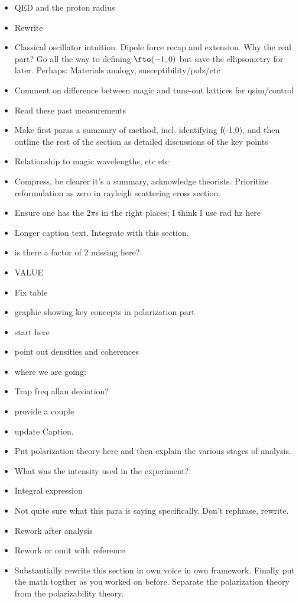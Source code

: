 \begin{itemize}
\item {QED and the proton radius}
\item {Rewrite}
\item {Classical oscillator intuition. Dipole force recap and extension. Why the real part? Go all the way to defining $\fto(-1,0)$ but save the ellipsometry for later. Perhaps: Materials analogy, susceptibility/polz/etc}
\item {Comment on difference between magic and tune-out lattices for qsim/control}
\item {Read these past measurements}
\item {Make first paras a summary of method, incl. identifying f(-1,0), and then outline the rest of the section as detailed discussions of the key points}
\item {Relationship to magic wavelengths, etc etc}
\item {Compress, be clearer it's a summary, acknowledge theorists. Prioritize reformulation as zero in rayleigh scattering cross section.}
\item {Ensure one has the $2\pi$s in the right places; I think I use rad hz here}
\item {Longer caption text. Integrate with this section.}
\item {is there a factor of 2 missing here?}
\item {VALUE}
\item {Fix table}
\item {graphic showing key concepts in polarization part}
\item {start here}
\item {point out densities and coherences}
\item {where we are going:}
\item {Trap freq allan deviation?}
\item {provide a couple}
\item {update Caption, }
\item {Put polarization theory here and then explain the various stages of analysis.}
\item {What was the intensity used in the experiment?}
\item {Integral expression}
\item {Not quite sure what this para is saying specifically. Don't rephrase, rewrite.}
\item {Rework after analysis}
\item {Rework or omit with reference}
\item {Substantially rewrite this section in own voice in own framework. Finally put the math togther as you worked on before. Separate the polarization theory from the polarizability theory. }
\end{itemize}
